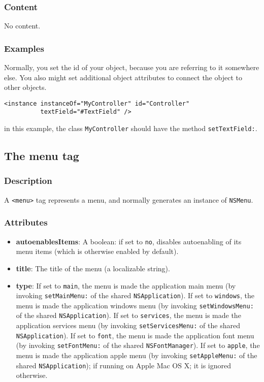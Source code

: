 \subsubsection{Content}
No content.

\subsubsection{Examples}
Normally, you set the id of your object, because you are referring to
it somewhere else.  You also might set additional object attributes to
connect the object to other objects.
\begin{verbatim}
<instance instanceOf="MyController" id="Controller" 
          textField="#TextField" />
\end{verbatim}
in this example, the class \texttt{MyController} should have the method
\texttt{setTextField:}.

\subsection{The menu tag}

\subsubsection{Description}
A \texttt{<menu>} tag represents a menu, and normally generates an
instance of \texttt{NSMenu}.

\subsubsection{Attributes}
\begin{itemize}
\item {\bf autoenablesItems}: A boolean: if set to \texttt{no}, disables 
autoenabling of its menu items (which is otherwise enabled by default).
\item {\bf title}: The title of the menu (a localizable string).
\item {\bf type}: If set to \texttt{main}, the menu is made the
application main menu (by invoking \texttt{setMainMenu:} of the shared
\texttt{NSApplication}).  If set to \texttt{windows}, the menu is made
the application windows menu (by invoking \texttt{setWindowsMenu:} of
the shared \texttt{NSApplication}).  If set to \texttt{services}, the
menu is made the application services menu (by invoking
\texttt{setServicesMenu:} of the shared \texttt{NSApplication}).  If
set to \texttt{font}, the menu is made the application font menu (by
invoking \texttt{setFontMenu:} of the shared \texttt{NSFontManager}).
If set to \texttt{apple}, the menu is made the application apple menu
(by invoking \texttt{setAppleMenu:} of the shared
\texttt{NSApplication}); if running on Apple Mac OS X; it is ignored
otherwise.
\end{itemize}

